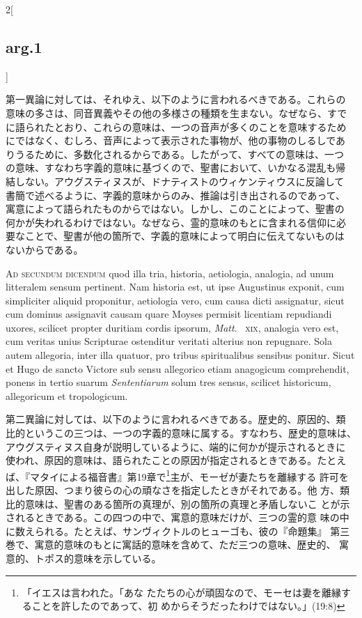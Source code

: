 \documentclass[
paper=a4paper,
fontsize=10pt,
jafontsize=9pt,
titlepage
]{jlreq}
\begin{document}
\begin{paracol}{2}[\subsection{arg.1}]
\switchcolumn

第一異論に対しては、それゆえ、以下のように言われるべきである。これらの
意味の多さは、同音異義やその他の多様さの種類を生まない。なぜなら、すで
に語られたとおり、これらの意味は、一つの音声が多くのことを意味するため
にではなく、むしろ、音声によって表示された事物が、他の事物のしるしであ
りうるために、多数化されるからである。したがって、すべての意味は、一つ
の意味、すなわち字義的意味に基づくので、聖書において、いかなる混乱も帰
結しない。アウグスティヌスが、ドナティストのウィケンティウスに反論して
書簡で述べるように、字義的意味からのみ、推論は引き出されるのであって、
寓意によって語られたものからではない。しかし、このことによって、聖書の
何かが失われるわけではない。なぜなら、霊的意味のもとに含まれる信仰に必
要なことで、聖書が他の箇所で、字義的意味によって明白に伝えてないものは
ないからである。

\switchcolumn*[\subsection{ad.2}]

{\scshape Ad secundum dicendum} quod illa tria, historia, aetiologia,
analogia, ad unum litteralem sensum pertinent. Nam historia est, ut
ipse Augustinus exponit, cum simpliciter aliquid proponitur,
aetiologia vero, cum causa dicti assignatur, sicut cum dominus
assignavit causam quare Moyses permisit licentiam repudiandi uxores,
scilicet propter duritiam cordis ipsorum, {\itshape Matt}.~{\scshape
xix}, analogia vero est, cum veritas unius Scripturae ostenditur
veritati alterius non repugnare. Sola autem allegoria, inter illa
quatuor, pro tribus spiritualibus sensibus ponitur. Sicut et Hugo de
sancto Victore sub sensu allegorico etiam anagogicum comprehendit,
ponens in tertio suarum {\itshape Sententiarum} solum tres sensus,
scilicet historicum, allegoricum et tropologicum.

\switchcolumn

第二異論に対しては、以下のように言われるべきである。歴史的、原因的、類
比的というこの三つは、一つの字義的意味に属する。すなわち、歴史的意味は、
アウグスティヌス自身が説明しているように、端的に何かが提示されるときに
使われ、原因的意味は、語られたことの原因が指定されるときである。たとえ
ば、『マタイによる福音書』第19章で\footnote{「イエスは言われた。「あな
たたちの心が頑固なので、モーセは妻を離縁することを許したのであって、初
めからそうだったわけではない。」(19:8) }主が、モーゼが妻たちを離縁する
許可を出した原因、つまり彼らの心の頑なさを指定したときがそれである。他
方、類比的意味は、聖書のある箇所の真理が、別の箇所の真理と矛盾しないこ
とが示されるときである。この四つの中で、寓意的意味だけが、三つの霊的意
味の中に数えられる。たとえば、サンヴィクトルのヒューゴも、彼の『命題集』
第三巻で、寓意的意味のもとに寓話的意味を含めて、ただ三つの意味、歴史的、
寓意的、トポス的意味を示している。


\end{paracol}
\end{document}
